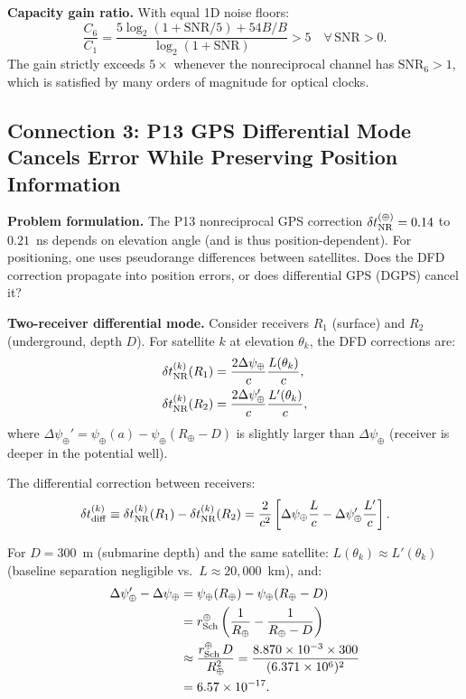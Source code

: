 \documentclass[aps,prd,twocolumn,superscriptaddress,nofootinbib]{revtex4-2}
\newcommand{\SNR}{\mathrm{SNR}}
\newcommand{\Rearth}{R_\oplus}
\newcommand{\rSch}{r_{\rm Sch}}
\begin{document}
\textbf{Capacity gain ratio.}  With equal 1D noise floors:
\begin{equation}
\frac{C_6}{C_1} = \frac{5\log_2(1+\SNR/5) + 54B/B}{\log_2(1+\SNR)}
> 5 \quad \forall\, \SNR > 0.
\end{equation}
The gain strictly exceeds $5\times$ whenever the nonreciprocal channel
has $\SNR_6 > 1$, which is satisfied by many orders of magnitude for
optical clocks.

\subsection{Connection 3: P13 GPS Differential Mode Cancels Error While
Preserving Position Information}
\label{sec:connection3}

\textbf{Problem formulation.}
The P13 nonreciprocal GPS correction $\delta t_{\rm NR}^{(\oplus)} = 0.14$
to $0.21$~ns depends on elevation angle (and is thus position-dependent).
For positioning, one uses pseudorange differences between satellites.
Does the DFD correction propagate into position errors, or does differential
GPS (DGPS) cancel it?

\textbf{Two-receiver differential mode.}
Consider receivers $R_1$ (surface) and $R_2$ (underground, depth $D$).
For satellite $k$ at elevation $\theta_k$, the DFD corrections are:
\begin{align}
\delta t_{\rm NR}^{(k)}(R_1) &= \frac{2\Delta\psi_\oplus}{c}\frac{L(\theta_k)}{c}, \\
\delta t_{\rm NR}^{(k)}(R_2) &= \frac{2\Delta\psi_\oplus'}{c}\frac{L'(\theta_k)}{c},
\end{align}
where $\Delta\psi_\oplus' = \psi_\oplus(a) - \psi_\oplus(\Rearth - D)$
is slightly larger than $\Delta\psi_\oplus$ (receiver is deeper in the
potential well).

The differential correction between receivers:
\begin{equation}
\delta t_{\rm diff}^{(k)} \equiv \delta t_{\rm NR}^{(k)}(R_1) - \delta t_{\rm NR}^{(k)}(R_2)
= \frac{2}{c^2}\left[\Delta\psi_\oplus\frac{L}{c} - \Delta\psi_\oplus'\frac{L'}{c}\right].
\end{equation}

For $D = 300$~m (submarine depth) and the same satellite:
$L(\theta_k) \approx L'(\theta_k)$ (baseline separation negligible vs.\
$L \approx 20{,}000$~km), and:
\begin{align}
\Delta\psi_\oplus' - \Delta\psi_\oplus &= \psi_\oplus(\Rearth) - \psi_\oplus(\Rearth-D) \nonumber\\
&= \rSch^\oplus\left(\frac{1}{\Rearth} - \frac{1}{\Rearth-D}\right) \nonumber\\
&\approx \frac{\rSch^\oplus\,D}{\Rearth^2}
= \frac{8.870\times 10^{-3}\times 300}{(6.371\times 10^6)^2} \nonumber\\
&= 6.57\times 10^{-17}.
\end{align}
\end{document}
